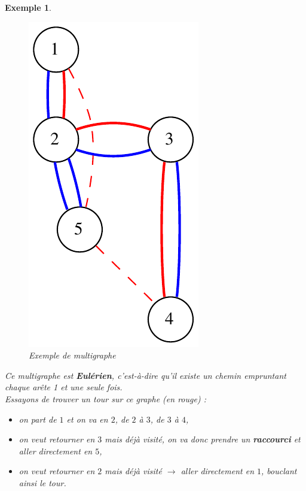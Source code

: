 \documentclass[12pt]{article}
\newtheorem{exemple}{Exemple}[section]
\begin{document}
\begin{exemple}$ $\\
\begin{figure}[h!]
    \begin{center}
    \includegraphics[scale=0.45]{multig.pdf}
    \caption{Exemple de multigraphe}
    \end{center}
\end{figure}

\noindent Ce multigraphe est \textbf{Eulérien}, c'est-à-dire qu'il existe un chemin empruntant chaque arête 1 et une seule fois.\\
Essayons de trouver un tour sur ce graphe (en rouge) :
\begin{itemize}
\item on part de $1$ et on va en $2$, de $2$ à $3$, de $3$ à $4$,
\item on veut retourner en $3$ mais déjà visité, on va donc prendre un \textbf{raccourci} et aller directement en $5$,
\item on veut retourner en $2$ mais déjà visité $\rightarrow$ aller directement en $1$, bouclant ainsi le tour.
\end{itemize}
\end{exemple}
\end{document}
